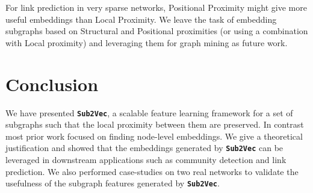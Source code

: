\documentclass[sigconf]{acmart}
\newcommand{\alg}{{\bf {\tt Sub2Vec}}\xspace}
\begin{document}
For link prediction in very sparse networks, Positional Proximity might give more useful embeddings than Local Proximity. 
We leave the task of embedding subgraphs based on Structural and Positional proximities (or using a combination with Local proximity) and leveraging them for graph mining as future work.  

 




\section{Conclusion}
We have presented \alg, a scalable feature learning framework for a set of subgraphs such that the local proximity between them are preserved. In contrast most prior work focused on finding node-level embeddings. 
We give a theoretical justification and showed that the embeddings generated by \alg can be leveraged in downstream applications such as community detection and link prediction. We also performed case-studies on two real networks to validate the usefulness of the subgraph features generated by \alg. 





\end{document}
